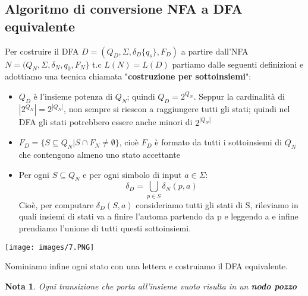\documentclass[12pt]{article}
\newtheorem{Nota}{Nota}[subsection]
\begin{document}
\subsection{Algoritmo di conversione NFA a DFA equivalente}
Per costruire il DFA $D = (Q_D, \Sigma, \delta_D \{q_s\}, F_D)$ a partire dall'NFA $N = (Q_N, \Sigma, \delta_N, q_0, F_N\}$ t.c $L(N) = L(D)$ partiamo dalle seguenti definizioni e adottiamo una tecnica chiamata "\textbf{costruzione per sottoinsiemi}":
\begin{itemize}
    \item $Q_D$ è l'insieme potenza di $Q_N$; quindi $Q_D = 2^{Q_N}$. Seppur la cardinalità di $|2^{Q_N}| = 2^{|Q_N|}$, non sempre si riescon a raggiungere tutti gli stati; quindi nel DFA gli stati potrebbero essere anche minori di $2^{|Q_N|}$
    \item $F_D = \{S \subseteq Q_N | S \cap F_N \neq \emptyset\}$, cioè $F_D$ è formato da tutti i sottoinsiemi di $Q_N$ che contengono almeno uno stato accettante
    \item Per ogni $S \subseteq Q_N$ e per ogni simbolo di input $a \in \Sigma$:
    $$\delta_D = \bigcup_{p \in S}\delta_N(p, a)$$
    Cioè, per computare $\delta_D(S, a)$ consideriamo tutti gli stati di S, rileviamo in quali insiemi di stati va a finire l'automa partendo da p e leggendo a e infine prendiamo l'unione di tutti questi sottoinsiemi.
\end{itemize}
\begin{center}
    \texttt{[image: images/7.PNG]}
\end{center}
Nominiamo infine ogni stato con una lettera e costruiamo il DFA equivalente.
\begin{Nota}
    Ogni transizione che porta all'insieme vuoto risulta in un \textbf{nodo pozzo}
\end{Nota}
\end{document}
